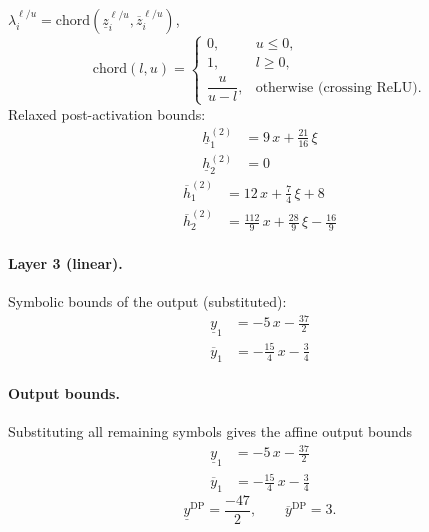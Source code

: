\documentclass[11pt]{article}
\begin{document}
$\lambda^{\ell/u}_i = \mathrm{chord}(\underline{z}_i^{\ell/u}, \overline{z}_i^{\ell/u})$,
\[
\mathrm{chord}(l, u) =
\begin{cases}
0, & u \le 0,\\
1, & l \ge 0,\\
\dfrac{u}{u - l}, & \text{otherwise (crossing ReLU)}.
\end{cases}\]
Relaxed post-activation bounds:
\begin{align*}
\underline{h}^{(2)}_{1} &= 9\,x + \frac{21}{16}\,\xi \\
\underline{h}^{(2)}_{2} &= 0
\end{align*}
\begin{align*}
\overline{h}^{(2)}_{1} &= 12\,x + \frac{7}{4}\,\xi + 8 \\
\overline{h}^{(2)}_{2} &= \frac{112}{9}\,x + \frac{28}{9}\,\xi - \frac{16}{9}
\end{align*}
\paragraph{Layer 3 (linear).}
Symbolic bounds of the output (substituted):
\begin{align*}
\underline{y}_{1} &= -5\,x - \frac{37}{2}
\end{align*}
\begin{align*}
\overline{y}_{1} &= -\frac{15}{4}\,x - \frac{3}{4}
\end{align*}
\paragraph{Output bounds.}
Substituting all remaining symbols gives the affine output bounds
\begin{align*}
\underline{y}_{1} &= -5\,x - \frac{37}{2}
\end{align*}
\begin{align*}
\overline{y}_{1} &= -\frac{15}{4}\,x - \frac{3}{4}
\end{align*}
\begin{equation*}
\underline{y}^{\text{DP}} = \frac{-47}{2}, \qquad \overline{y}^{\text{DP}} = 3.
\end{equation*}
\end{document}
